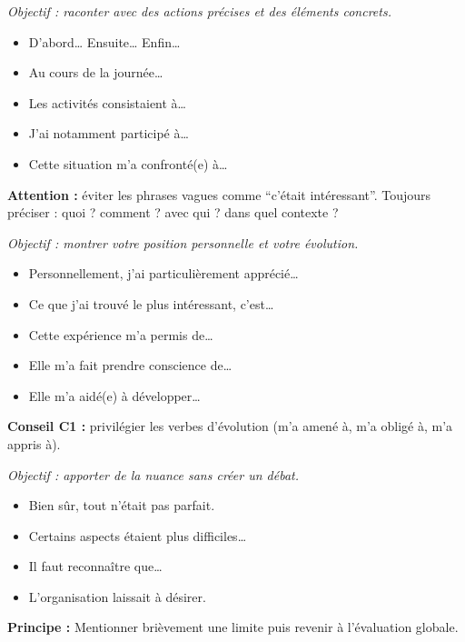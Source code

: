 \documentclass[12pt,a4paper]{article}
\begin{document}
\begin{tcolorbox}[title=\textbf{STEP 2 · Décrire le déroulement concret (3–4 phrases)}]
\emph{Objectif : raconter avec des actions précises et des éléments concrets.}

\begin{itemize}
  \item D'abord… Ensuite… Enfin…
  \item Au cours de la journée…
  \item Les activités consistaient à…
  \item J'ai notamment participé à…
  \item Cette situation m'a confronté(e) à…
\end{itemize}

\textbf{Attention :} éviter les phrases vagues comme ``c'était intéressant''.  
Toujours préciser : quoi ? comment ? avec qui ? dans quel contexte ?
\end{tcolorbox}


\begin{tcolorbox}[title=\textbf{STEP 3 · Exprimer le ressenti personnel (2–3 phrases)}]
\emph{Objectif : montrer votre position personnelle et votre évolution.}

\begin{itemize}
  \item Personnellement, j'ai particulièrement apprécié…
  \item Ce que j'ai trouvé le plus intéressant, c'est…
  \item Cette expérience m'a permis de…
  \item Elle m'a fait prendre conscience de…
  \item Elle m'a aidé(e) à développer…
\end{itemize}

\textbf{Conseil C1 :} privilégier les verbes d'évolution (m'a amené à, m'a obligé à, m'a appris à).
\end{tcolorbox}


\begin{tcolorbox}[title=\textbf{STEP 4 · Introduire une limite maîtrisée (facultatif mais valorisant)}]
\emph{Objectif : apporter de la nuance sans créer un débat.}

\begin{itemize}
  \item Bien sûr, tout n'était pas parfait.
  \item Certains aspects étaient plus difficiles…
  \item Il faut reconnaître que…
  \item L'organisation laissait à désirer.
\end{itemize}

\textbf{Principe :} Mentionner brièvement une limite puis revenir à l'évaluation globale.
\end{tcolorbox}
\end{document}
